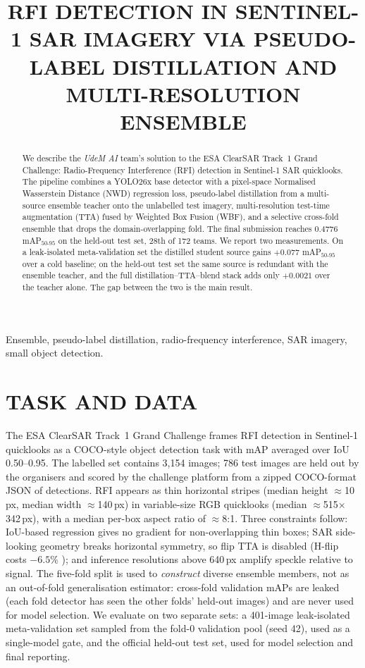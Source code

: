 \documentclass{article}
\title{RFI DETECTION IN SENTINEL-1 SAR IMAGERY VIA PSEUDO-LABEL
DISTILLATION AND MULTI-RESOLUTION ENSEMBLE}
\begin{document}
\ninept
\maketitle

\begin{abstract}
We describe the \emph{UdeM AI} team's solution to the ESA ClearSAR
Track~1 Grand Challenge: Radio-Frequency Interference (RFI) detection
in Sentinel-1 SAR quicklooks. The pipeline combines a YOLO26x base
detector with a pixel-space Normalised Wasserstein Distance (NWD)
regression loss, pseudo-label distillation from a multi-source ensemble
teacher onto the unlabelled test imagery, multi-resolution test-time
augmentation (TTA) fused by Weighted Box Fusion (WBF), and a selective
cross-fold ensemble that drops the domain-overlapping fold. The final
submission reaches 0.4776 mAP$_{50\text{-}95}$ on the held-out test
set, 28th of 172 teams. We report two measurements. On a leak-isolated
meta-validation set the distilled student source gains $+0.077$
mAP$_{50\text{-}95}$ over a cold baseline; on the held-out test set the
same source is redundant with the ensemble teacher, and the full
distillation--TTA--blend stack adds only $+0.0021$ over the teacher
alone. The gap between the two is the main result.
\end{abstract}

\begin{keywords}
Ensemble, pseudo-label distillation, radio-frequency interference,
SAR imagery, small object detection.
\end{keywords}

\section{TASK AND DATA}
\label{sec:task}

The ESA ClearSAR Track~1 Grand Challenge \cite{clearsar2026} frames
RFI detection in Sentinel-1 quicklooks as a COCO-style object
detection task with mAP averaged over IoU 0.50--0.95. The labelled
set contains 3{,}154 images; 786 test images are held out by the
organisers and scored by the challenge platform from a zipped
COCO-format JSON of detections. RFI appears as thin horizontal stripes (median height
$\approx$10\,px, median width $\approx$140\,px) in variable-size RGB
quicklooks (median $\approx$515$\times$342\,px), with a median
per-box aspect ratio of $\approx$8:1. Three constraints follow:
IoU-based regression gives no gradient for non-overlapping thin boxes;
SAR side-looking geometry breaks horizontal symmetry, so flip TTA is
disabled (H-flip costs $-6.5\%$ \cite{oliver2004sar}); and inference
resolutions above 640\,px amplify speckle relative to signal. The
five-fold split is used to \emph{construct} diverse ensemble members,
not as an out-of-fold generalisation estimator: cross-fold validation
mAPs are leaked (each fold detector has seen the other folds' held-out
images) and are never used for model selection. We evaluate on two
separate sets: a 401-image leak-isolated meta-validation set sampled
from the fold-0 validation pool (seed 42), used as a single-model gate,
and the official held-out test set, used for model selection and final
reporting.
\end{document}
